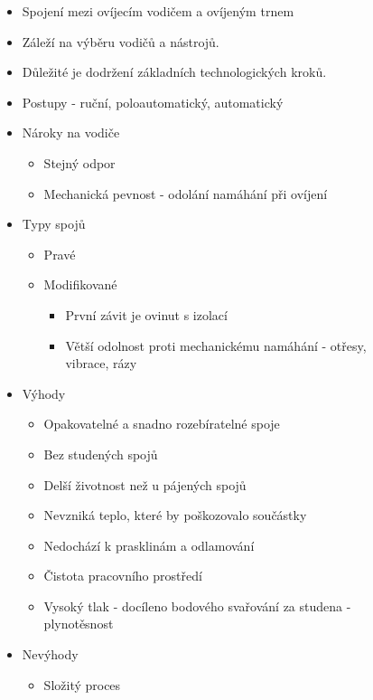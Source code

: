 \documentclass{article}
\begin{document}
\begin{figure}[H]
  \begin{minipage}[t]{0.58\textwidth}
    \begin{itemize}
      \item Spojení mezi ovíjecím vodičem a ovíjeným trnem
      \item Záleží na výběru vodičů a nástrojů.
      \item Důležité je dodržení základních technologických kroků.
      \item Postupy - ruční, poloautomatický, automatický
      \item Nároky na vodiče
      \begin{itemize}
        \item Stejný odpor
        \item Mechanická pevnost - odolání namáhání při ovíjení
      \end{itemize}
      \item Typy spojů
      \begin{itemize}
        \item Pravé
        \item Modifikované
        \begin{itemize}
          \item První závit je ovinut s izolací
          \item Větší odolnost proti mechanickému namáhání - otřesy, vibrace, rázy
        \end{itemize}
      \end{itemize}
      \item	Výhody
      \begin{itemize}
        \item Opakovatelné a snadno rozebíratelné spoje
        \item Bez studených spojů
        \item Delší životnost než u pájených spojů
        \item Nevzniká teplo, které by poškozovalo součástky
        \item Nedochází k prasklinám a odlamování
        \item Čistota pracovního prostředí
        \item Vysoký tlak - docíleno bodového svařování za studena - plynotěsnost
      \end{itemize}
      \item Nevýhody
      \begin{itemize}
        \item Složitý proces

\end{itemize}
\end{itemize}
\end{minipage}
\end{figure}
\end{document}
